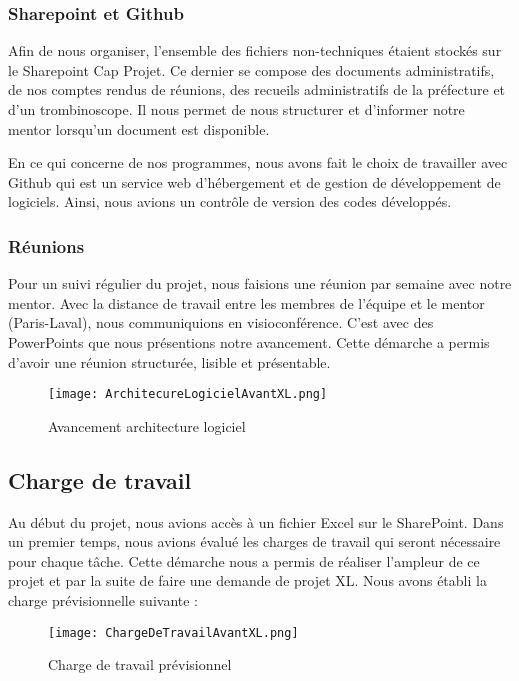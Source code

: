 \subsubsection{Sharepoint et Github}
Afin de nous organiser, l’ensemble des fichiers non-techniques étaient stockés sur le Sharepoint Cap Projet. Ce dernier se compose des documents administratifs, de nos comptes rendus de réunions, des recueils administratifs de la préfecture et d’un trombinoscope. 
Il nous permet de nous structurer et d’informer notre mentor lorsqu’un document est disponible. 

En ce qui concerne de nos programmes, nous avons fait le choix de travailler avec Github qui est un service web d'hébergement et de gestion de développement de logiciels. Ainsi, nous avions un contrôle de version des codes développés. 


\subsubsection{Réunions}
Pour un suivi régulier du projet, nous faisions une réunion par semaine avec notre mentor. Avec la distance de travail entre les membres de l’équipe et le mentor (Paris-Laval), nous communiquions en visioconférence. 
C’est avec des PowerPoints que nous présentions notre avancement. Cette démarche a permis d’avoir une réunion structurée, lisible et présentable. 

\begin{figure}[h!]
  \centering
  \texttt{[image: ArchitecureLogicielAvantXL.png]}
	\caption[]{Avancement architecture logiciel}
	\label{}
\end{figure}




\subsection{Charge de travail}
Au début du projet, nous avions accès à un fichier Excel sur le SharePoint. Dans un premier temps, nous avions évalué les charges de travail qui seront nécessaire pour chaque tâche. Cette démarche nous a permis de réaliser l’ampleur de ce projet et par la suite de faire une demande de projet XL. 
Nous avons établi la charge prévisionnelle suivante :

\begin{figure}[h!]
  \centering
  \texttt{[image: ChargeDeTravailAvantXL.png]}
	\caption[]{Charge de travail prévisionnel}
	\label{}
\end{figure}

